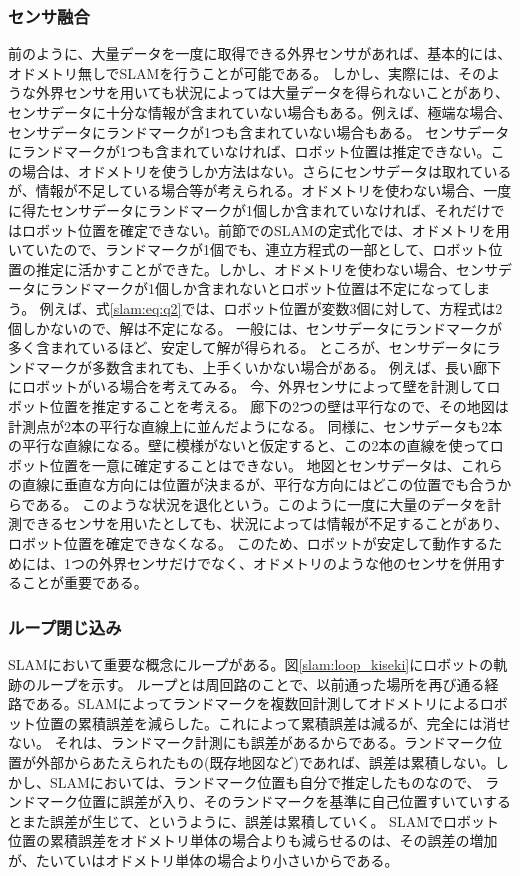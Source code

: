\subsubsection{センサ融合}
前のように、大量データを一度に取得できる外界センサがあれば、基本的には、オドメトリ無しでSLAMを行うことが可能である。
しかし、実際には、そのような外界センサを用いても状況によっては大量データを得られないことがあり、センサデータに十分な情報が含まれていない場合もある。例えば、極端な場合、センサデータにランドマークが1つも含まれていない場合もある。
センサデータにランドマークが1つも含まれていなければ、ロボット位置は推定できない。この場合は、オドメトリを使うしか方法はない。さらにセンサデータは取れているが、情報が不足している場合等が考えられる。オドメトリを使わない場合、一度に得たセンサデータにランドマークが1個しか含まれていなければ、それだけではロボット位置を確定できない。前節でのSLAMの定式化では、オドメトリを用いていたので、ランドマークが1個でも、連立方程式の一部として、ロボット位置の推定に活かすことができた。しかし、オドメトリを使わない場合、センサデータにランドマークが1個しか含まれないとロボット位置は不定になってしまう。
例えば、式\eqref{slam:eq:q2}では、ロボット位置が変数3個に対して、方程式は2個しかないので、解は不定になる。
一般には、センサデータにランドマークが多く含まれているほど、安定して解が得られる。
ところが、センサデータにランドマークが多数含まれても、上手くいかない場合がある。
例えば、長い廊下にロボットがいる場合を考えてみる。
今、外界センサによって壁を計測してロボット位置を推定することを考える。
廊下の2つの壁は平行なので、その地図は計測点が2本の平行な直線上に並んだようになる。
同様に、センサデータも2本の平行な直線になる。壁に模様がないと仮定すると、この2本の直線を使ってロボット位置を一意に確定することはできない。
地図とセンサデータは、これらの直線に垂直な方向には位置が決まるが、平行な方向にはどこの位置でも合うからである。
このような状況を退化という。このように一度に大量のデータを計測できるセンサを用いたとしても、状況によっては情報が不足することがあり、ロボット位置を確定できなくなる。
このため、ロボットが安定して動作するためには、1つの外界センサだけでなく、オドメトリのような他のセンサを併用することが重要である。

\subsubsection{ループ閉じ込み}
SLAMにおいて重要な概念にループがある。図\ref{slam:loop_kiseki}にロボットの軌跡のループを示す。
ループとは周回路のことで、以前通った場所を再び通る経路である。SLAMによってランドマークを複数回計測してオドメトリによるロボット位置の累積誤差を減らした。これによって累積誤差は減るが、完全には消せない。
それは、ランドマーク計測にも誤差があるからである。ランドマーク位置が外部からあたえられたもの(既存地図など)であれば、誤差は累積しない。しかし、SLAMにおいては、ランドマーク位置も自分で推定したものなので、
ランドマーク位置に誤差が入り、そのランドマークを基準に自己位置すいていするとまた誤差が生じて、というように、誤差は累積していく。
SLAMでロボット位置の累積誤差をオドメトリ単体の場合よりも減らせるのは、その誤差の増加が、たいていはオドメトリ単体の場合より小さいからである。

